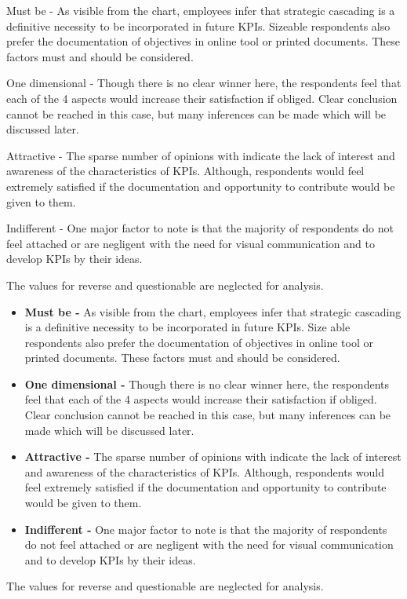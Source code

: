 Must be - As visible from the chart, employees infer that strategic cascading is a definitive necessity to be incorporated in future KPIs. Sizeable respondents also prefer the documentation of objectives in online tool or printed documents. These factors must and should be considered. 

One dimensional -  Though there is no clear winner here, the respondents feel that each of the 4 aspects would increase their satisfaction if obliged. Clear conclusion cannot be reached in this case, but many inferences can be made which will be discussed later.

Attractive - The sparse number of opinions with indicate the lack of interest and awareness of the characteristics of KPIs. Although, respondents would feel extremely satisfied if the documentation and opportunity to contribute would be given to them.

Indifferent - One major factor to note is that the majority of respondents do not feel attached or are negligent with the need for visual communication and to develop KPIs by their ideas.

The values for reverse and questionable are neglected for analysis.
\begin{itemize}
    \item \textbf{Must be -} As visible from the chart, employees infer that strategic cascading is a definitive necessity to be incorporated in future KPIs. Size able respondents also prefer the documentation of objectives in online tool or printed documents. These factors must and should be considered. 
    \item \textbf{One dimensional -}  Though there is no clear winner here, the respondents feel that each of the 4 aspects would increase their satisfaction if obliged. Clear conclusion cannot be reached in this case, but many inferences can be made which will be discussed later.
    \item \textbf{Attractive -} The sparse number of opinions with indicate the lack of interest and awareness of the characteristics of KPIs. Although, respondents would feel extremely satisfied if the documentation and opportunity to contribute would be given to them.
    \item \textbf{Indifferent -} One major factor to note is that the majority of respondents do not feel attached or are negligent with the need for visual communication and to develop KPIs by their ideas.

\end{itemize}
The values for reverse and questionable are neglected for analysis.

